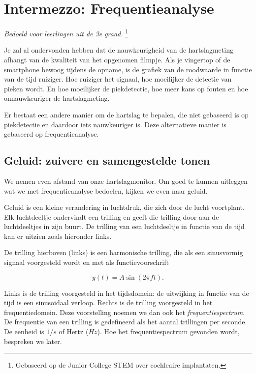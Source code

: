 \section{Intermezzo: Frequentieanalyse}
\label{sec:Mod4_Sec3}
%
\emph{Bedoeld voor leerlingen uit de 3e graad.}
\footnote{Gebaseerd op de Junior College STEM over cochleaire implantaten.}

Je zal al ondervonden hebben dat de nauwkeurigheid van de hartslagmeting afhangt van de kwaliteit van het opgenomen filmpje. Als je vingertop of de smartphone bewoog tijdens de opname, is de grafiek van de roodwaarde in functie van de tijd ruiziger. Hoe ruiziger het signaal, hoe moeilijker de detectie van pieken wordt. En hoe moeilijker de piekdetectie, hoe meer kans op fouten en hoe onnauwkeuriger de hartslagmeting.

Er bestaat een andere manier om de hartslag te bepalen, die niet gebaseerd is op piekdetectie en daardoor iets nauwkeuriger is. Deze alternatieve manier is gebaseerd op frequentieanalyse.

\subsection{Geluid: zuivere en samengestelde tonen}

We nemen even afstand van onze hartslagmonitor. Om goed te kunnen uitleggen wat we met frequentieanalyse bedoelen, kijken we even naar geluid.

Geluid is een kleine verandering in luchtdruk, die zich door de lucht voortplant. Elk luchtdeeltje ondervindt een trilling en geeft die trilling door aan de luchtdeeltjes in zijn buurt. De trilling van een luchtdeeltje in functie van de tijd kan er uitzien zoals hieronder links.


De trilling hierboven (links) is een harmonische trilling, die als een sinusvormig signaal voorgesteld wordt en met als functievoorschrift 

\begin{equation*}
y(t) = A \sin(2\pi f t).
\end{equation*}

Links is de trilling voorgesteld in het tijdsdomein: de uitwijking in functie van de tijd is een sinusoidaal verloop. Rechts is de trilling voorgesteld in het frequentiedomein. Deze voorstelling noemen we dan ook het \emph{frequentiespectrum}. De frequentie van een trilling is gedefineerd als het aantal trillingen per seconde. De eenheid is $1/s$ of Hertz ($Hz$). Hoe het frequentiespectrum gevonden wordt, bespreken we later.


